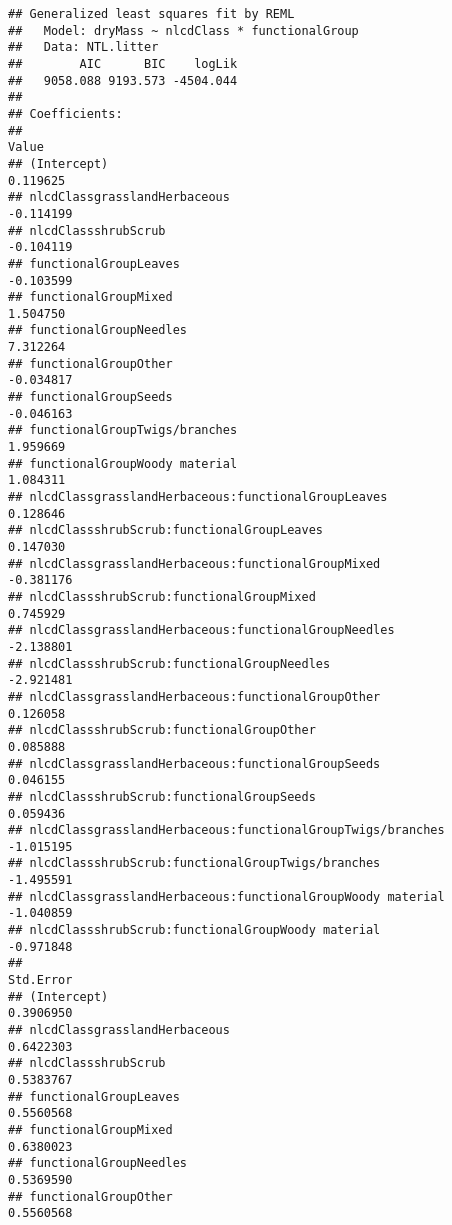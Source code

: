 \documentclass[]{article}
\begin{document}
\begin{verbatim}
## Generalized least squares fit by REML
##   Model: dryMass ~ nlcdClass * functionalGroup 
##   Data: NTL.litter 
##        AIC      BIC    logLik
##   9058.088 9193.573 -4504.044
## 
## Coefficients:
##                                                                Value
## (Intercept)                                                 0.119625
## nlcdClassgrasslandHerbaceous                               -0.114199
## nlcdClassshrubScrub                                        -0.104119
## functionalGroupLeaves                                      -0.103599
## functionalGroupMixed                                        1.504750
## functionalGroupNeedles                                      7.312264
## functionalGroupOther                                       -0.034817
## functionalGroupSeeds                                       -0.046163
## functionalGroupTwigs/branches                               1.959669
## functionalGroupWoody material                               1.084311
## nlcdClassgrasslandHerbaceous:functionalGroupLeaves          0.128646
## nlcdClassshrubScrub:functionalGroupLeaves                   0.147030
## nlcdClassgrasslandHerbaceous:functionalGroupMixed          -0.381176
## nlcdClassshrubScrub:functionalGroupMixed                    0.745929
## nlcdClassgrasslandHerbaceous:functionalGroupNeedles        -2.138801
## nlcdClassshrubScrub:functionalGroupNeedles                 -2.921481
## nlcdClassgrasslandHerbaceous:functionalGroupOther           0.126058
## nlcdClassshrubScrub:functionalGroupOther                    0.085888
## nlcdClassgrasslandHerbaceous:functionalGroupSeeds           0.046155
## nlcdClassshrubScrub:functionalGroupSeeds                    0.059436
## nlcdClassgrasslandHerbaceous:functionalGroupTwigs/branches -1.015195
## nlcdClassshrubScrub:functionalGroupTwigs/branches          -1.495591
## nlcdClassgrasslandHerbaceous:functionalGroupWoody material -1.040859
## nlcdClassshrubScrub:functionalGroupWoody material          -0.971848
##                                                            Std.Error
## (Intercept)                                                0.3906950
## nlcdClassgrasslandHerbaceous                               0.6422303
## nlcdClassshrubScrub                                        0.5383767
## functionalGroupLeaves                                      0.5560568
## functionalGroupMixed                                       0.6380023
## functionalGroupNeedles                                     0.5369590
## functionalGroupOther                                       0.5560568

\end{verbatim}
\end{document}
